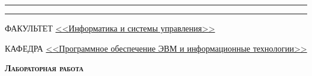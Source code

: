 \begin{titlepage}
    \begin{flushleft}
        \rule[-1cm]{\textwidth}{0.5pt}
        \rule{\textwidth}{2.5pt}
    \end{flushleft}

    \begin{flushleft}
        \small
        ФАКУЛЬТЕТ \uline{<<Информатика и системы управления>> \hfill} \par
        \vspace{0.25cm}
        КАФЕДРА \uline{<<Программное обеспечение ЭВМ и информационные технологии>> \hfill} \par
    \end{flushleft}

    \vspace{4cm}

    {\LARGE\scshape\bfseries
        Лабораторная работа 
    }

    \vspace{2cm}

    \begin{flushleft}
        \large


\end{flushleft}
\end{titlepage}
